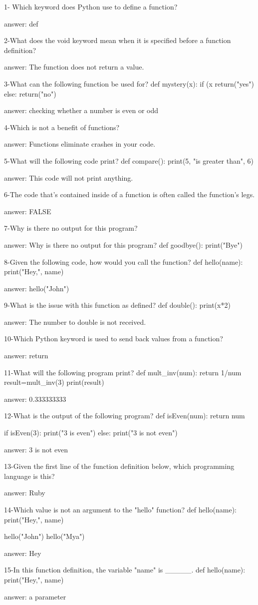 1- Which keyword does Python use to define a function?

answer: def

2-What does the void keyword mean when it is specified before a function definition?

answer: The function does not return a value.

3-What can the following function be used for?
def mystery(x):
  if (x %
    return("yes")
  else:
    return("no")
    
answer: checking whether a number is even or odd

4-Which is not a benefit of functions?

answer: Functions eliminate crashes in your code.

5-What will the following code print?
 def compare():
  print(5, "is greater than", 6)

answer: This code will not print anything.

6-The code that's contained inside of a function is often called the function's legs.

answer: FALSE

7-Why is there no output for this program?

answer: Why is there no output for this program?
def goodbye():
  print("Bye")

8-Given the following code, how would you call the function?
def hello(name):
  print("Hey,", name)

answer: hello("John")

9-What is the issue with this function as defined?
def double():
  print(x*2)

answer: The number to double is not received.

10-Which Python keyword is used to send back values from a function?

answer: return

11-What will the following program print?
def mult_inv(num):
  return 1/num
 result=mult_inv(3)
 print(result)

answer: 0.333333333

12-What is the output of the following program?
def isEven(num):
  return num %

 if isEven(3):
    print("3 is even")
 else:
    print("3 is not even")

answer: 3 is not even

13-Given the first line of the function definition below, which programming language is this?

answer: Ruby

14-Which value is not an argument to the "hello" function?
def hello(name):
  print("Hey,", name)

 hello("John")
 hello("Mya")

answer: Hey

15-In this function definition, the variable "name" is _____.
def hello(name):
  print("Hey,", name)

answer: a parameter

